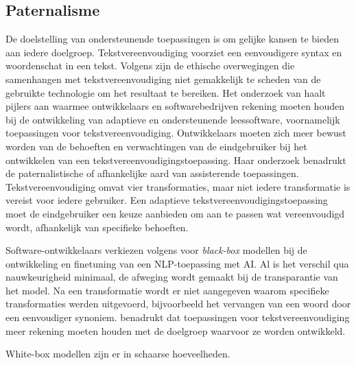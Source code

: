 



\subsection{Paternalisme}

De doelstelling van ondersteunende toepassingen is om gelijke kansen te bieden aan iedere doelgroep. Tekstvereenvoudiging voorziet een eenvoudigere syntax en woordenschat in een tekst. Volgens \textcite{Niemeijer2010} zijn de ethische overwegingen die samenhangen met tekstvereenvoudiging niet gemakkelijk te scheden van de gebruikte technologie om het resultaat te bereiken. Het onderzoek van \textcite{Gooding2022} haalt pijlers aan waarmee ontwikkelaars en softwarebedrijven rekening moeten houden bij de ontwikkeling van adaptieve en ondersteunende leessoftware, voornamelijk toepassingen voor tekstvereenvoudiging. Ontwikkelaars moeten zich meer bewust worden van de behoeften en verwachtingen van de eindgebruiker bij het ontwikkelen van een tekstvereenvoudigingstoepassing. Haar onderzoek benadrukt de paternalistische of afhankelijke aard van assisterende toepassingen. Tekstvereenvoudiging omvat vier transformaties, maar niet iedere transformatie is vereist voor iedere gebruiker. Een adaptieve tekstvereenvoudigingstoepassing moet de eindgebruiker een keuze aanbieden om aan te passen wat vereenvoudigd wordt, afhankelijk van specifieke behoeften.


Software-ontwikkelaars verkiezen volgens \textcite{Punardeep2020} voor \textit{black-box} modellen bij de ontwikkeling en finetuning van een NLP-toepassing met AI. Al is het verschil qua nauwkeurigheid minimaal, de afweging wordt gemaakt bij de transparantie van het model. Na een transformatie wordt er niet aangegeven waarom specifieke transformaties werden uitgevoerd, bijvoorbeeld het vervangen van een woord door een eenvoudiger synoniem. \textcite{Xu2015} benadrukt dat toepassingen voor tekstvereenvoudiging meer rekening moeten houden met de doelgroep waarvoor ze worden ontwikkeld.

White-box modellen zijn er in schaarse hoeveelheden. 

